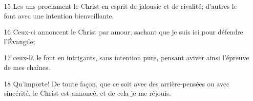 
15 Les uns proclament le Christ en esprit de jalousie et de rivalité; d’autres le font avec une intention bienveillante.

16 Ceux-ci annoncent le Christ par amour, sachant que je suis ici pour défendre l’Évangile;

17 ceux-là le font en intrigants, sans intention pure, pensant aviver ainsi l’épreuve de mes chaînes.

18 Qu’importe! De toute façon, que ce soit avec des arrière-pensées ou avec sincérité, le Christ est annoncé, et de cela je me réjouis.